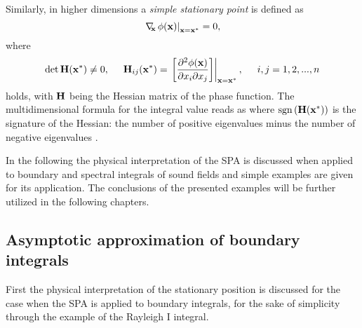 Similarly, in higher dimensions a \emph{simple stationary point} is defined as
\begin{equation}
\label{Eq:ndim_stat_point}
\left.
\nabla_{\!\!\mathbf{x}}\, \phi(\mathbf{x})\right|_{\mathbf{x} = \mathbf{x}^*} = 0,
\end{equation}
where 
\begin{equation}
\det \mathbf{H}(\mathbf{x}^*) \neq 0,
\hspace{5mm} 
\mathbf{H}_{ij}(\mathbf{x}^*) = \left. \left[
\frac{\partial^2 \phi(\mathbf{x})}{\partial x_i \partial x_j} 
\right] \right|_{\mathbf{x} = \mathbf{x}^*},
\hspace{5mm}
i,j = 1,2,...,n
\end{equation}
holds, with $\mathbf{H}$ being the Hessian matrix of the phase function.
The multidimensional formula for the integral value reads as
where $\mathrm{sgn}\left( \mathbf{H}(\mathbf{x}^*) \right)$ is the signature of the Hessian: the number of positive eigenvalues minus the number of negative eigenvalues \cite{Bleistein2000}.

In the following the physical interpretation of the SPA is discussed when applied to boundary and spectral integrals of sound fields and simple examples are given for its application.
The conclusions of the presented examples will be further utilized in the following chapters.

\subsection{Asymptotic approximation of boundary integrals}
\label{Sec:HS_approx:SPA_for_Rayleigh}
First the physical interpretation of the stationary position is discussed for the case when the SPA is applied to boundary integrals, for the sake of simplicity through the example of the Rayleigh I integral.
%

